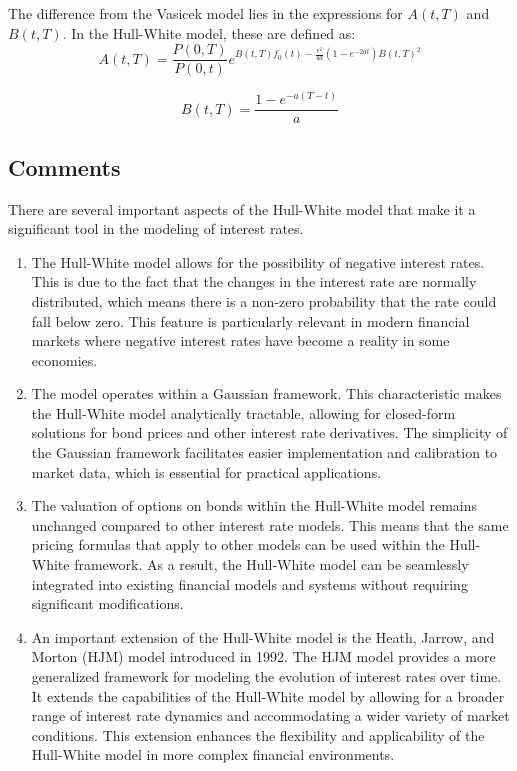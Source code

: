 \documentclass[a4paper,10pt]{article}
\begin{document}
\noindent The difference from the Vasicek model lies in the expressions for \( A(t, T) \) and \( B(t, T) \). In the Hull-White model, these are defined as:
\[A(t, T) = \frac{P(0, T)}{P(0, t)}e^{B(t, T)f_0(t) - \frac{\epsilon^2}{4a}(1 - e^{-2at})B(t, T)^2}\]

\[B(t, T) = \frac{1 - e^{-a(T-t)}}{a}\]

\subsection{Comments}

\noindent There are several important aspects of the Hull-White model that make it a significant tool in the modeling of interest rates.

\begin{enumerate}
    \item The Hull-White model allows for the possibility of negative interest rates. This is due to the fact that the changes in the interest rate are normally distributed, which means there is a non-zero probability that the rate could fall below zero. This feature is particularly relevant in modern financial markets where negative interest rates have become a reality in some economies.
    
    \item The model operates within a Gaussian framework. This characteristic makes the Hull-White model analytically tractable, allowing for closed-form solutions for bond prices and other interest rate derivatives. The simplicity of the Gaussian framework facilitates easier implementation and calibration to market data, which is essential for practical applications.
    
    \item The valuation of options on bonds within the Hull-White model remains unchanged compared to other interest rate models. This means that the same pricing formulas that apply to other models can be used within the Hull-White framework. As a result, the Hull-White model can be seamlessly integrated into existing financial models and systems without requiring significant modifications.
    
    \item An important extension of the Hull-White model is the Heath, Jarrow, and Morton (HJM) model introduced in 1992. The HJM model provides a more generalized framework for modeling the evolution of interest rates over time. It extends the capabilities of the Hull-White model by allowing for a broader range of interest rate dynamics and accommodating a wider variety of market conditions. This extension enhances the flexibility and applicability of the Hull-White model in more complex financial environments.
\end{enumerate}
\end{document}
